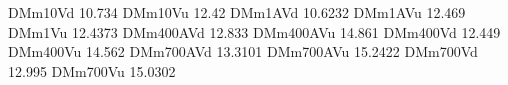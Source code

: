 DMm10Vd 10.734
DMm10Vu 12.42
DMm1AVd 10.6232
DMm1AVu 12.469
DMm1Vu 12.4373
DMm400AVd 12.833
DMm400AVu 14.861
DMm400Vd 12.449
DMm400Vu 14.562
DMm700AVd 13.3101
DMm700AVu 15.2422
DMm700Vd 12.995
DMm700Vu 15.0302
